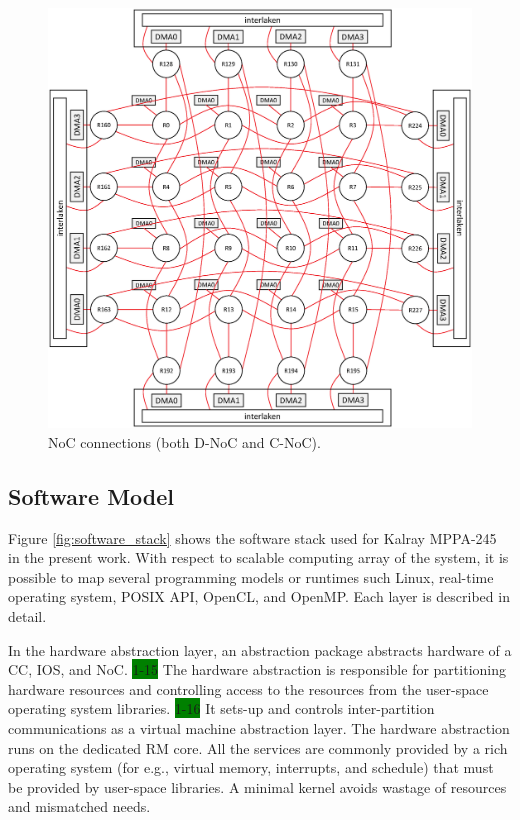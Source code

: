 \documentclass[conference,compsoc]{IEEEtran}
\begin{document}
\begin{figure}[t]
  \centering
  \includegraphics[width=0.8\linewidth]{../figure/noc_map.eps}
  \caption{\label{fig:noc_map}
    NoC connections (both D-NoC and C-NoC).}
\end{figure}

\subsection{Software Model}
\label{sec:software_model}
Figure \ref{fig:software_stack} shows the software stack used for Kalray MPPA-245 in the present work.
With respect to scalable computing array of the system, it is possible to map several programming models or runtimes such Linux, real-time operating system, POSIX API, OpenCL, and OpenMP.
Each layer is described in detail.

In the hardware abstraction layer, an abstraction package abstracts hardware of a CC, IOS, and NoC.
\colorbox{green}{1-15} %
The hardware abstraction is responsible for partitioning hardware resources and controlling access to the resources from the user-space operating system libraries.
\colorbox{green}{1-16} 
It sets-up and controls inter-partition communications as a virtual machine abstraction layer.
The hardware abstraction runs on the dedicated RM core.
All the services are commonly provided by a rich operating system (for e.g., virtual memory, interrupts, and schedule) that must be provided by user-space libraries.
A minimal kernel avoids wastage of resources and mismatched needs.
\end{document}
